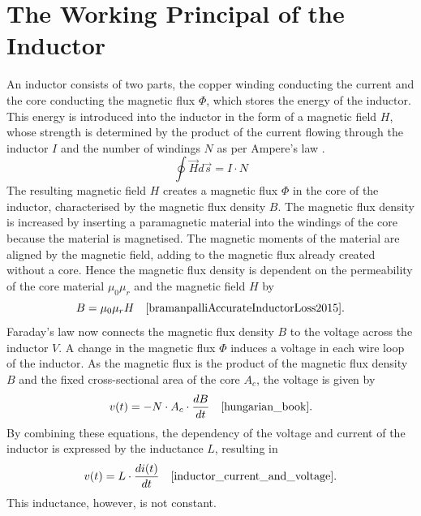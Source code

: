 \section{The Working Principal of the Inductor}\label{sec:the_working_principal_of_the_inductor}
An inductor consists of two parts, the copper winding conducting the current and the core conducting the magnetic flux $\Phi$, which stores the energy of the inductor. This energy is introduced into the inductor in the form of a magnetic field $H$, whose strength is determined by the product of the current flowing through the inductor $I$ and the number of windings $N$ as per Ampere's law \cite{al2019implementations}. 
\begin{equation}\label{eq:amperes_law}
    \oint \Vec{H} d\Vec{s} = I \cdot N
\end{equation}
The resulting magnetic field $H$ creates a magnetic flux $\Phi$ in the core of the inductor, characterised by the magnetic flux density $B$. The magnetic flux density is increased by inserting a paramagnetic material into the windings of the core because the material is magnetised. The magnetic moments of the material are aligned by the magnetic field, adding to the magnetic flux already created without a core. Hence the magnetic flux density is dependent on the permeability of the core material $\mu_0\mu_r$ and the magnetic field $H$ by
\begin{equation}
    B = \mu_0 \mu_r H \quad\text{\cite{bramanpalliAccurateInductorLoss2015}.}
\end{equation}
Faraday's law now connects the magnetic flux density $B$ to the voltage across the inductor $V$. A change in the magnetic flux $\Phi$ induces a voltage in each wire loop of the inductor. As the magnetic flux is the product of the magnetic flux density $B$ and the fixed cross-sectional area of the core $A_c$, the voltage is given by
\begin{equation}
    v(t) = -N\cdot A_c \cdot \frac{dB}{dt}\quad\text{\cite{hungarian_book}.}
\end{equation}
By combining these equations, the dependency of the voltage and current of the inductor is expressed by the inductance $L$, resulting in
\begin{equation} \label{eq:faradays_law}
    v(t) = L\cdot\frac{di(t)}{dt}\quad\text{\cite{inductor_current_and_voltage}.}
\end{equation}
This inductance, however, is not constant. \\

